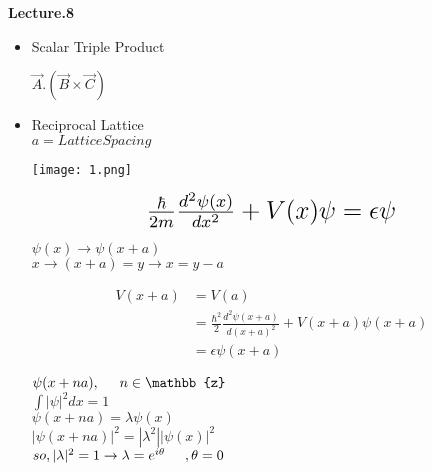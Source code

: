 \documentclass[11]{article}
\begin{document}
\begin{titlepage}
\begin{center}
\Large\textbf{Lecture.8}
\end{center}

\begin{itemize}
\item Scalar Triple Product\\
\vspace{0.3cm}

$
\vec{A}.(\vec{B}\times \vec{C})
$

\item Reciprocal Lattice\\

$a= Lattice Spacing $
\begin{center}
\texttt{[image: 1.png]}

\end{center}

\begin{equation*}
\large
\scalebox{1.5}{$\frac{\hbar}{2m} \frac{d^{2}\psi(x)}{dx^{2}}+V(x)\psi=\epsilon \psi$}
\end{equation*}
\vspace{1cm}

$\psi (x) \rightarrow \psi (x+a)$\\

$x \rightarrow (x+a) = y \rightarrow x=y-a$



\begin{equation*}
\begin{split}
V(x+a)& =V(a)\\
& =\frac{\hbar^{2}}{2} \frac{d^{2}\psi(x+a)}{d(x+a)^{2}}+V(x+a) \psi(x+a)\\
& =\epsilon \psi(x+a)
\end{split}
\end{equation*}

$\psi(x+na), \hspace{5mm}  n \in \mathbb{z}$\\

$\int |\psi|^{2} dx = 1$\\

$\psi (x+na)= \lambda \psi(x)$\\

$|\psi (x+na)|^{2} = |\lambda^{2}| |\psi (x)|^{2}$\\

$ so, |\lambda|^{2} =1 \rightarrow \lambda =e^{i \theta} \hspace{5mm}, \theta=0$\\


\end{itemize}
\end{titlepage}
\end{document}
